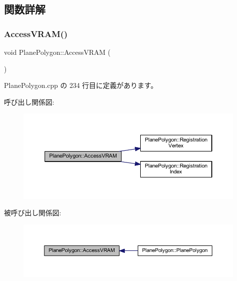 \subsection{関数詳解}
\mbox{\label{class_plane_polygon_a88e476aa4b627d7242dc4f1b5eccf889}} 
\subsubsection{\texorpdfstring{Access\+V\+R\+A\+M()}{AccessVRAM()}}
{\footnotesize\ttfamily void Plane\+Polygon\+::\+Access\+V\+R\+AM (\begin{DoxyParamCaption}{ }\end{DoxyParamCaption})\hspace{0.3cm}{\ttfamily [private]}}



 Plane\+Polygon.\+cpp の 234 行目に定義があります。

呼び出し関係図\+:\nopagebreak
\begin{figure}[H]
\begin{center}
\leavevmode
\includegraphics[width=350pt]{class_plane_polygon_a88e476aa4b627d7242dc4f1b5eccf889_cgraph}
\end{center}
\end{figure}
被呼び出し関係図\+:\nopagebreak
\begin{figure}[H]
\begin{center}
\leavevmode
\includegraphics[width=350pt]{class_plane_polygon_a88e476aa4b627d7242dc4f1b5eccf889_icgraph}
\end{center}
\end{figure}
\mbox{\label{class_plane_polygon_a55840ace8bfa216c37f94e963b3fa5e3}} 
